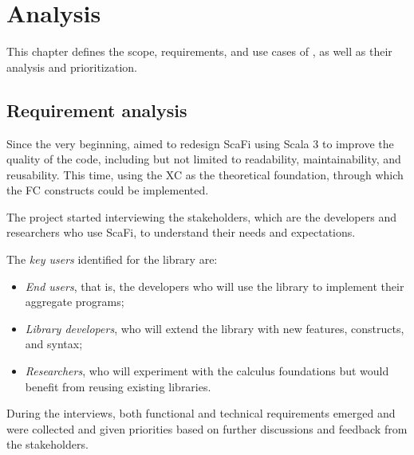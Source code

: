 \chapter{Analysis}
\label{chap:analysis}
This chapter defines the scope, requirements, and use cases of \this, as well as their analysis and prioritization.

\section{Requirement analysis} \label{chap:analysis->sec:requirement-analysis}

Since the very beginning, \this aimed to redesign ScaFi using Scala 3 to improve the quality of the code, including but not limited to readability, maintainability, and reusability.
%
This time, using the \ac{XC} as the theoretical foundation, through which the \ac{FC} constructs could be implemented.

The project started interviewing the stakeholders, which are the developers and researchers who use ScaFi, to understand their needs and expectations.

The \textit{key users} identified for the library are:
\begin{itemize}
    \item \textit{End users}, that is, the developers who will use the library to implement their aggregate programs;
    \item \textit{Library developers}, who will extend the library with new features, constructs, and syntax;
    \item \textit{Researchers}, who will experiment with the calculus foundations but would benefit from reusing existing libraries.
\end{itemize}

During the interviews, both functional and technical requirements emerged and were collected and given priorities based on further discussions and feedback from the stakeholders.

